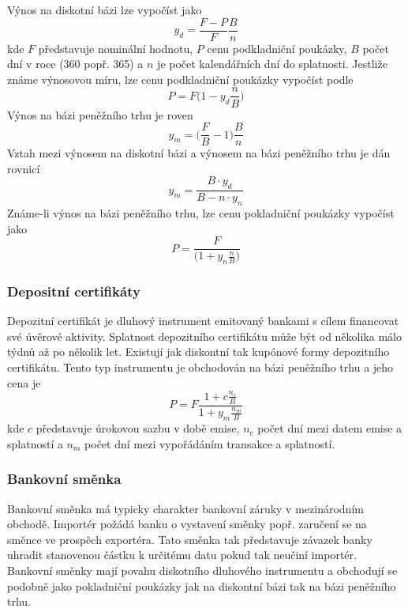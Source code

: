 \documentclass[a4paper]{book}
\begin{document}
Výnos na diskotní bázi lze vypočíst jako
\begin{equation*}
y_d = \frac{F - P}{F}\frac{B}{n}
\end{equation*}
kde $F$ představuje nominální hodnotu, $P$ cenu podkladniční poukázky, $B$ počet dní v roce (360 popř. 365) a $n$ je počet kalendářních dní do splatnosti. Jestliže známe výnosovou míru, lze cenu podkladniční poukázky vypočíst podle
\begin{equation*}
P = F\Bigg(1 - y_d\frac{n}{B}\Bigg)
\end{equation*}
Výnos na bázi peněžního trhu je roven
\begin{equation*}
y_m = \Bigg( \frac{F}{B} - 1 \Bigg) \frac{B}{n}
\end{equation*}
Vztah mezi výnosem na diskotní bázi a výnosem na bázi peněžního trhu je dán rovnicí
\begin{equation*}
y_m = \frac{B \cdot y_d}{B-n \cdot y_n}
\end{equation*}
Známe-li výnos na bázi peněžního trhu, lze cenu pokladniční poukázky vypočíst jako
\begin{equation*}
P = \frac{F}{\Bigg( 1 + y_n\frac{n}{B}\Bigg)}
\end{equation*}

\subsubsection{Depositní certifikáty}

Depozitní certifikát je dluhový instrument emitovaný bankami s cílem financovat své úvěrové aktivity. Splatnost depozitního certifikátu může být od několika málo týdnů až po několik let. Existují jak diskontní tak kupónové formy depozitního certifikátu. Tento typ instrumentu je obchodován na bázi peněžního trhu a jeho cena je
\begin{equation*}
P = F \frac{1 + c \frac{n_c}{B}}{1 + y_m \frac{n_m}{B}}
\end{equation*}
kde $c$ představuje úrokovou sazbu v době emise, $n_c$ počet dní mezi datem emise a splatností a $n_m$ počet dní mezi vypořádáním transakce a splatností.

\subsubsection{Bankovní směnka}

Bankovní směnka má typicky charakter bankovní záruky v mezinárodním obchodě. Importér požádá banku o vystavení směnky popř. zaručení se na směnce ve prospěch exportéra. Tato směnka tak představuje závazek banky uhradit stanovenou částku k určitému datu pokud tak neučiní importér. Bankovní směnky mají povahu diskotního dluhového instrumentu a obchodují se podobně jako pokladniční poukázky jak na diskontní bázi tak na bázi peněžního trhu.
\end{document}

